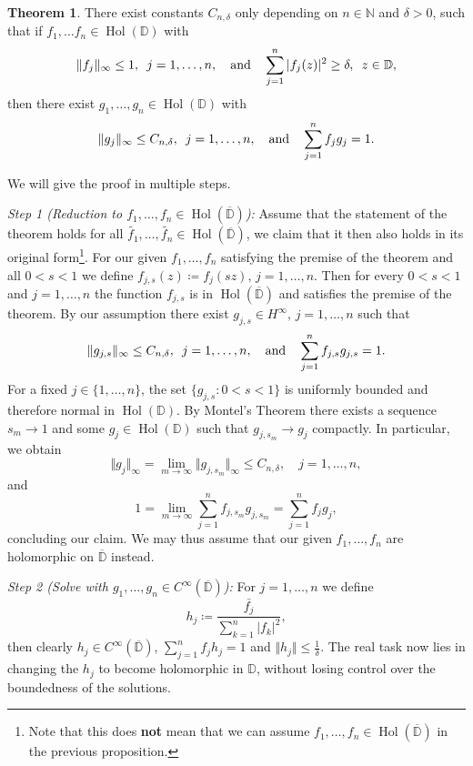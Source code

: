\documentclass[letterpaper, 11pt]{article}
\newcommand{\D}{\mathbb{D}}
\newcommand{\N}{\mathbb{N}}
\newcommand{\1}{\mathds{1}}
\newcommand{\cl}[1]{\overline{#1}}
\DeclareMathOperator*{\Hol}{Hol}
\theoremstyle{definition}
\newtheorem{theorem}{Theorem}
\newenvironment{innerproof}
 {\renewcommand{\qedsymbol}{}\proof}
 {\endproof}
\begin{document}
\begin{theorem}
  There exist constants $C_{n,\delta}$ only depending on $n \in \N$ and $\delta > 0$, such that if $f_1, \dots f_n \in \Hol(\D)$ with
  $$ \Vert f_j \Vert_\infty \leq 1, \hspace{0.5em} j = 1, \dots, n, \quad \textrm{and} \quad \sum_{j=1}^n \vert f_j(z) \vert^2 \geq \delta, \hspace{0.5em} z \in \D, $$
  then there exist $g_1, \dots, g_n \in \Hol(\D)$ with
  $$ \Vert g_j \Vert_\infty \leq C_{n,\delta}, \hspace{0.5em} j = 1, \dots, n, \quad \textrm{and} \quad \sum_{j=1}^n f_j g_j = 1. $$
\end{theorem}

\begin{innerproof}
  We will give the proof in multiple steps.

  \textit{Step 1 (Reduction to $f_1, \dots, f_n \in \Hol(\cl{\D})$):} Assume that the statement of the theorem holds for all $\widetilde{f_1}, \dots, \widetilde{f_n} \in \Hol(\cl{\D})$, we claim that it then also holds in its original form\footnote{Note that this does \textbf{not} mean that we can assume $f_1, \dots, f_n \in \Hol(\cl{\D})$ in the previous proposition.}. For our given $f_1, \dots, f_n$ satisfying the premise of the theorem and all $0 < s < 1$ we define $ f_{j,s}(z) \coloneqq f_{j}(sz), \, j=1,\dots,n $. Then for every $0 < s < 1$ and $j = 1, \dots, n$ the function $f_{j,s}$ is in $\Hol(\cl{\D})$ and satisfies the premise of the theorem. By our assumption there exist $g_{j,s} \in H^\infty, \, j=1,\dots,n$ such that
  $$ \Vert g_{j,s} \Vert_\infty \leq C_{n,\delta}, \hspace{0.5em} j = 1, \dots, n, \quad \textrm{and} \quad \sum_{j=1}^n f_{j,s} g_{j,s} = 1. $$
  For a fixed $j \in \{ 1, \dots, n \}$, the set $\{ g_{j,s} : 0 < s < 1 \}$ is uniformly bounded and therefore normal in $\Hol(\D)$. By Montel's Theorem there exists a sequence $s_m \to 1$ and some $g_j \in \Hol(\D)$ such that $g_{j,s_m} \to g_{j}$ compactly. In particular, we obtain
  $$ \Vert g_j \Vert_\infty = \lim_{m \to \infty} \Vert g_{j,s_m} \Vert_\infty \leq C_{n,\delta}, \quad j=1,\dots,n, $$
  and
  $$ 1 = \lim_{m \to \infty} \sum_{j=1}^n f_{j,s_m} g_{j,s_m} = \sum_{j=1}^n f_j g_j, $$
  concluding our claim. We may thus assume that our given $f_1, \dots, f_n$ are holomorphic on $\cl{\D}$ instead.

  \textit{Step 2 (Solve with $g_1, \dots, g_n \in C^\infty(\cl{\D})$):} For $j=1,\dots,n$ we define
  $$ h_j \coloneqq \frac{\bar{f_j}}{\sum_{k=1}^n \vert f_k \vert^2}, $$
  then clearly $h_j \in C^\infty(\cl{\D})$, $ \sum_{j=1}^n f_j h_j = 1$ and $\Vert h_j \Vert \leq \frac{1}{\delta}$. The real task now lies in changing the $h_j$ to become holomorphic in $\D$, without losing control over the boundedness of the solutions.
\end{innerproof}
\end{document}
